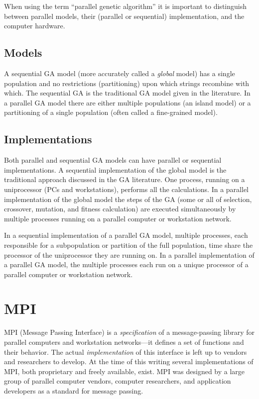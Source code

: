 \documentclass{report}
\begin{document}
When using the term ``parallel genetic algorithm'' it is important to
distinguish between parallel models, their (parallel or sequential)
implementation, and the computer hardware.

\subsection*{Models}

A sequential GA model (more accurately called a {\em global} model) has a
single population and no restrictions (partitioning) upon which strings
recombine with which.  The sequential GA is the traditional GA model given in
the literature.  In a parallel GA model there are either multiple
populations (an island model) or a partitioning of a single population (often
called a fine-grained model).
  
\subsection*{Implementations}

Both parallel and sequential GA models can have parallel or sequential
implementations.  A sequential implementation of the global model is the
traditional approach discussed in the GA literature.  One process, running on
a uniprocessor (PCs and workstations), performs all the calculations.  In a
parallel implementation of the global model the steps of the GA (some or all
of selection, crossover, mutation, and fitness calculation) are executed
simultaneously by multiple processes running on a parallel computer or
workstation network.

In a sequential implementation of a parallel GA model, multiple processes,
each responsible for a subpopulation or partition of the full population, time
share the processor of the  uniprocessor they are running on.  In a parallel
implementation of a parallel GA model, the multiple processes each run on a
unique processor of a parallel computer or workstation network.



\section*{MPI}


MPI (Message Passing Interface) is a {\em specification} of a message-passing
library for parallel computers and workstation networks---it defines a set of
functions and their behavior.  The actual {\em implementation} of this
interface is left up to vendors and researchers to develop.  At the time of
this writing several implementations of MPI, both proprietary and freely
available, exist.  MPI was designed by a large group of parallel computer
vendors, computer researchers, and application developers as a standard for
message passing.
\end{document}
